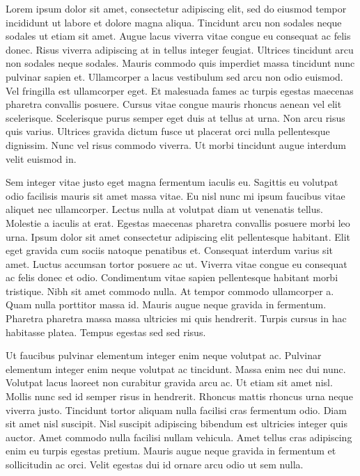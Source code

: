 \documentclass[
]{article}
\begin{document}
Lorem ipsum dolor sit amet, consectetur adipiscing elit, sed do eiusmod tempor incididunt ut labore et dolore magna aliqua. Tincidunt arcu non sodales neque sodales ut etiam sit amet. Augue lacus viverra vitae congue eu consequat ac felis donec. Risus viverra adipiscing at in tellus integer feugiat. Ultrices tincidunt arcu non sodales neque sodales. Mauris commodo quis imperdiet massa tincidunt nunc pulvinar sapien et. Ullamcorper a lacus vestibulum sed arcu non odio euismod. Vel fringilla est ullamcorper eget. Et malesuada fames ac turpis egestas maecenas pharetra convallis posuere. Cursus vitae congue mauris rhoncus aenean vel elit scelerisque. Scelerisque purus semper eget duis at tellus at urna. Non arcu risus quis varius. Ultrices gravida dictum fusce ut placerat orci nulla pellentesque dignissim. Nunc vel risus commodo viverra. Ut morbi tincidunt augue interdum velit euismod in.

Sem integer vitae justo eget magna fermentum iaculis eu. Sagittis eu volutpat odio facilisis mauris sit amet massa vitae. Eu nisl nunc mi ipsum faucibus vitae aliquet nec ullamcorper. Lectus nulla at volutpat diam ut venenatis tellus. Molestie a iaculis at erat. Egestas maecenas pharetra convallis posuere morbi leo urna. Ipsum dolor sit amet consectetur adipiscing elit pellentesque habitant. Elit eget gravida cum sociis natoque penatibus et. Consequat interdum varius sit amet. Luctus accumsan tortor posuere ac ut. Viverra vitae congue eu consequat ac felis donec et odio. Condimentum vitae sapien pellentesque habitant morbi tristique. Nibh sit amet commodo nulla. At tempor commodo ullamcorper a. Quam nulla porttitor massa id. Mauris augue neque gravida in fermentum. Pharetra pharetra massa massa ultricies mi quis hendrerit. Turpis cursus in hac habitasse platea. Tempus egestas sed sed risus.

Ut faucibus pulvinar elementum integer enim neque volutpat ac. Pulvinar elementum integer enim neque volutpat ac tincidunt. Massa enim nec dui nunc. Volutpat lacus laoreet non curabitur gravida arcu ac. Ut etiam sit amet nisl. Mollis nunc sed id semper risus in hendrerit. Rhoncus mattis rhoncus urna neque viverra justo. Tincidunt tortor aliquam nulla facilisi cras fermentum odio. Diam sit amet nisl suscipit. Nisl suscipit adipiscing bibendum est ultricies integer quis auctor. Amet commodo nulla facilisi nullam vehicula. Amet tellus cras adipiscing enim eu turpis egestas pretium. Mauris augue neque gravida in fermentum et sollicitudin ac orci. Velit egestas dui id ornare arcu odio ut sem nulla.
\end{document}
